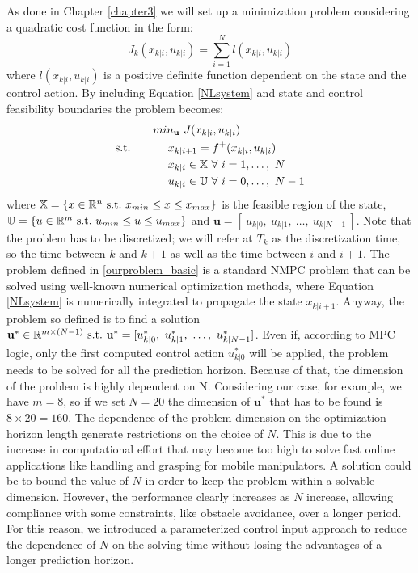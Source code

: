 As done in Chapter \ref{chapter3} we will set up a minimization problem considering a quadratic cost function in the form:
\begin{equation}
J_{k}({x}_{k|i},{u}_{k|i})=\sum_{i=1}^{N}l({x}_{k|i},{u}_{k|i})
\end{equation} 
where $l({x}_{k|i},{u}_{k|i})$ is a positive definite function dependent on the state and the control action. By including Equation \ref{NLsystem} and state and control feasibility boundaries the problem becomes: 
\begin{equation} \label{ourproblem_basic}
\begin{split}
		& min_{\textbf{u}}\ J({x}_{k|i},{u}_{k|i}) \\
		\textnormal{s.t.}\qquad
		&\ \ \ \ x_{k|i+1}=f^+(x_{k|i},u_{k|i}) \\
		&\ \ \ \ {x}_{k|i} \in \mathbb{X}\ \forall\ i=1,\dots,\ N  \\
		&\ \ \ \ {u}_{k|i} \in \mathbb{U}\ \forall\ i=0,\dots,\ N-1 \\
	\end{split}	
\end{equation}
where $\mathbb{X} = \lbrace {x}\in \mathbb{R}^n\ \textnormal{s.t.}\ {x}_{min}\leq x\leq x_{max} \rbrace$ is the feasible region of the state, $\mathbb{U} = \lbrace {u}\in \mathbb{R}^m\ \textnormal{s.t.}\ {u}_{min}\leq{u}\leq{u}_{max} \rbrace $ and $\textbf{u}=[\ u_{k|0},\ u_{k|1},\ \dots,\ u_{k|N-1}\ ]$.
Note that the problem has to be discretized; we will refer at $T_k$ as the discretization time, so the time between $k$ and $k+1$ as well as the time between $i$ and $i+1$.
The problem defined in \ref{ourproblem_basic} is a standard NMPC problem that can be solved using well-known numerical optimization methods, where Equation \ref{NLsystem} is numerically integrated to propagate the state ${x}_{k|i+1}$. Anyway, the problem so defined is to find a solution $\textbf{u}^* \in \mathbb{R}^{m\times(N-1)}\ \textnormal{s.t.}\ \textbf{u}^* =[{u}^*_{k|0},\ {u}^*_{k|1},\ \dots,\ {u}^*_{k|N-1}]$. Even if, according to MPC logic, only the first computed control action ${u}^*_{k|0}$ will be applied, the problem needs to be solved for all the prediction horizon. Because of that, the dimension of the problem is highly dependent on N. Considering our case, for example, we have $m=8$, so if we set $N=20$ the dimension of $\textbf{u}^*$ that has to be found is $8\times20=160$. The dependence of the problem dimension on the optimization horizon length generate restrictions on the choice of $N$. This is due to the increase in computational effort that may become too high to solve fast online applications like handling and grasping for mobile manipulators. A solution could be to bound the value of $N$ in order to keep the problem within a solvable dimension. However, the performance clearly increases as $N$ increase, allowing compliance with some constraints, like obstacle avoidance, over a longer period. For this reason, we introduced a parameterized control input approach to reduce the dependence of $N$ on the solving time without losing the advantages of a longer prediction horizon.


